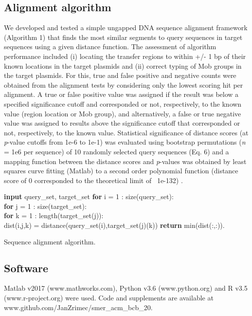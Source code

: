 \documentclass[sigconf]{acmart}
\begin{document}
\subsection{Alignment algorithm}
We developed and tested a simple ungapped DNA sequence alignment framework (Algorithm 1) that finds the most similar segments to query sequences in target sequences using a given distance function. The assessment of algorithm performance included (i) locating the transfer regions to within +/- 1 bp of their known locations in the target plasmids and (ii) correct typing of Mob groups in the target plasmids. For this, true and false positive and negative counts were obtained from the alignment tests by considering only the lowest scoring hit per alignment. A true or false positive value was assigned if the result was below a specified significance cutoff and corresponded or not, respectively, to the known value (region location or Mob group), and alternatively, a false or true negative value was assigned to results above the significance cutoff that corresponded or not, respectively, to the known value. Statistical significance of distance scores (at \textit{p}-value cutoffs from 1e-6 to 1e-1) was evaluated using bootstrap permutations (\textit{n} = 1e6 per sequence) of 10 randomly selected query sequences (Eq. 6) and a mapping function between the distance scores and \textit{p}-values was obtained by least squares curve fitting (Matlab) to a second order polynomial function (distance score of 0 corresponded to the theoretical limit of ~1e-132) \cite{Zrimec2020-wx}. 

\begin{algorithm}
\SetAlgoLined
 \textbf{input} query\_set, target\_set\;
 \textbf{for} i = 1 : size(query\_set):\\
 \enskip \textbf{for} j = 1 : size(target\_set):\\
 \quad \textbf{for} k = 1 : length(target\_set(j)):\\
 \qquad dist(i,j,k) = distance(query\_set(i),target\_set(j)(k))\;
 \textbf{return} min(dist(:,:)).
 \caption{Sequence alignment algorithm.}
\end{algorithm}

\subsection{Software}
Matlab v2017 (www.mathworks.com), Python v3.6 (www.python.org) and R v3.5 (www.r-project.org) were used. Code and supplements are available at www.github.com/JanZrimec/smer\_acm\_bcb\_20.
\end{document}

